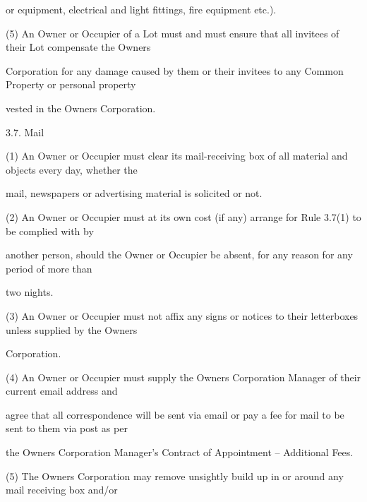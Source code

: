 \documentclass{article}
\begin{document}
{\fontsize{10.02}{1}or equipment, electrical and light fittings, fire equipment etc.). }

{\fontsize{9.962}{1}(5) An Owner or Occupier of a Lot must and must ensure that all invitees of their Lot compensate the Owners }

{\fontsize{10.02}{1}Corporation for any damage caused by them or their invitees to any Common Property or personal property }

{\fontsize{10.02}{1}vested in the Owners Corporation. }

{\fontsize{9.99}{1}3.7. Mail }

{\fontsize{9.962}{1}(1) An Owner or Occupier must clear its mail-receiving box of all material and objects every day, whether the }

{\fontsize{10.02}{1}mail, newspapers or advertising material is solicited or not. }

{\fontsize{9.962}{1}(2) An Owner or Occupier must at its own cost (if any) arrange for Rule 3.7(1) to be complied with by }

{\fontsize{10.02}{1}another person, should the Owner or Occupier be absent, for any reason for any period of more than }

{\fontsize{10.02}{1}two nights. }

\newpage



















{\fontsize{9.962}{1}(3) An Owner or Occupier must not affix any signs or notices to their letterboxes unless supplied by the Owners }

{\fontsize{10.02}{1}Corporation. }

{\fontsize{9.962}{1}(4) An Owner or Occupier must supply the Owners Corporation Manager of their current email address and }

{\fontsize{10.02}{1}agree that all correspondence will be sent via email or pay a fee for mail to be sent to them via post as per }

{\fontsize{10.02}{1}the Owners Corporation Manager’s Contract of Appointment – Additional Fees. }

{\fontsize{9.962}{1}(5) The Owners Corporation may remove unsightly build up in or around any mail receiving box and/or }
\end{document}
